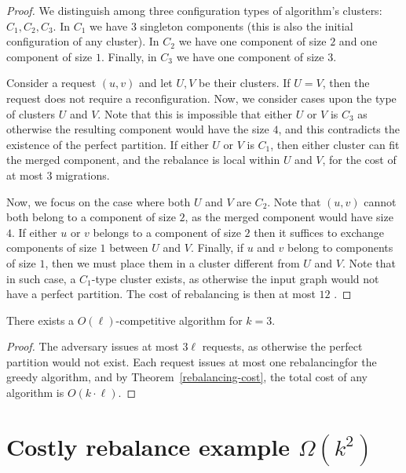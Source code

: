\begin{proof} 
  
  We distinguish among three configuration types of algorithm's clusters: $C_1, C_2, C_3$. In $C_1$ we have $3$ singleton components (this is also the initial configuration of any cluster). In $C_2$ we have one component of size $2$ and one component of size $1$. Finally, in $C_3$ we have one component of size $3$.

  Consider a request $(u, v)$ and let $U, V$ be their clusters.
  If $U=V$, then the request does not require a reconfiguration.
  Now, we consider cases upon the type of clusters $U$ and $V$.
  Note that this is impossible that either $U$ or $V$ is $C_3$ as otherwise the resulting component would have the size $4$, and this contradicts the existence of the perfect partition.
  If either $U$ or $V$ is $C_1$, then either cluster can fit the merged component, and the rebalance is local within $U$ and $V$, for the cost of at most $3$ migrations.

  Now, we focus on the case where both $U$ and $V$ are $C_2$. Note that $(u,v)$ cannot both belong to a component of size $2$, as the merged component would have size $4$.
  If either $u$ or $v$ belongs to a component of size $2$ then it suffices to exchange components of size $1$ between $U$ and $V$.
  Finally, if $u$ and $v$ belong to components of size $1$, then we must place them in a cluster different from $U$ and $V$.
  Note that in such case, a $C_1$-type cluster exists, as otherwise the input graph would not have a perfect partition. The cost of rebalancing is then at most $12$ .
\end{proof}

\begin{theorem}
  There exists a $O(\ell)$-competitive algorithm for $k=3$.
\end{theorem}

\begin{proof}
  The adversary issues at most $3\ell$ requests, as otherwise the perfect partition would not exist. Each request issues at most one rebalancingfor the greedy algorithm, and by Theorem~\ref{rebalancing-cost}, the total cost of any algorithm is $O(k\cdot \ell)$.
\end{proof}

\section{Costly rebalance example $\Omega(k^2)$}